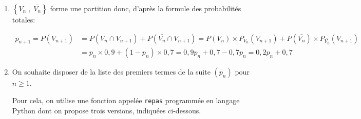 \documentclass[10pt]{article}
\begin{document}
\begin{enumerate}
\item
$\left \{ V_n\;,\; \overline{V_n} \right \}$ forme une partition donc, d'après la formule des probabilités totales:

$\begin{aligned}
p_{n+1}=P\left(V_{n+1}\right)
&  = P\left(V_n \cap V_{n+1}\right) +P\left (\overline{V_n} \cap V_{n+1}\right)
= P\left(V_n\right) \times P_{V_n}\left(V_{n+1}\right) + P\left(\overline{ V_n} \right) \times P_{\overline{V_n}}\left(V_{n+1}\right)\\
& = p_n\times 0,9+ \left (1-p_n\right )\times 0,7
= 0,9p_n + 0,7 - 0,7p_n = 0,2p_n + 0,7
\end{aligned}$

\item On souhaite disposer de la liste des premiers termes de la suite $(p_n)$ pour $n \geqslant 1$.

Pour cela, on utilise une fonction appelée \texttt{repas} programmée en langage Python dont on propose trois versions, indiquées ci-dessous.


\begin{center}
{\scriptsize
{}
}
\end{center}


\end{enumerate}
\end{document}
